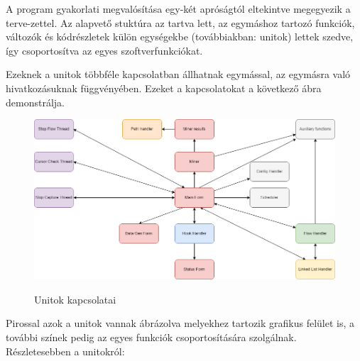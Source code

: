 \lstset{style=delphicode}



A program gyakorlati megvalósítása egy-két apróságtól eltekintve megegyezik a terve\hyp{}zettel. Az alapvető stuktúra az tartva lett, az egymáshoz tartozó funkciók, változók és kódrészletek külön egységekbe (továbbiakban: unitok) lettek szedve, így csoportosítva az egyes szoftverfunkciókat.

Ezeknek a unitok többféle kapcsolatban állhatnak egymással, az egymásra való hivatkozásuknak függvényében. Ezeket a kapcsolatokat a következő ábra demonstrálja.

\begin{figure}[h]
	\begin{center}
		\caption{Unitok kapcsolatai}
		\includegraphics[width=\textwidth, keepaspectratio=true]{images/unitok_kapcsolati_abra}\\
		\label{fig:example}
	\end{center}
\end{figure}

Pirossal azok a unitok vannak ábrázolva melyekhez tartozik grafikus felület is, a további színek pedig az egyes funkciók csoportosítására szolgálnak. Részletesebben a unitokról:

